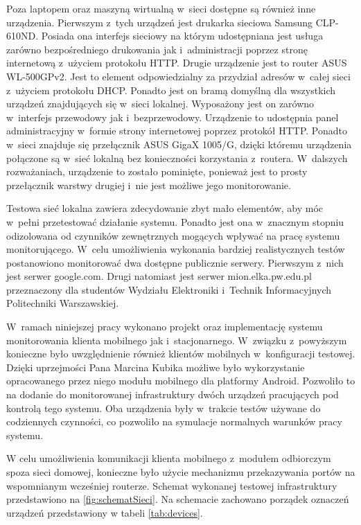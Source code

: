 Poza laptopem oraz maszyną wirtualną w~sieci dostępne są również inne
urządzenia. Pierwszym z~tych urządzeń jest drukarka sieciowa Samsung
CLP-610ND. Posiada ona interfejs sieciowy na którym udostępniana jest
usługa zarówno bezpośredniego drukowania jak i~administracji poprzez
stronę internetową z~użyciem protokołu HTTP. Drugie urządzenie jest to
router ASUS WL-500GPv2. Jest to element odpowiedzialny za przydział
adresów w~całej sieci z~użyciem protokołu DHCP. Ponadto jest on bramą
domyślną dla wszystkich urządzeń znajdujących się w~sieci
lokalnej. Wyposażony jest on zarówno w~interfejs przewodowy jak
i~bezprzewodowy. Urządzenie to udostępnia panel administracyjny
w~formie strony internetowej poprzez protokół HTTP. Ponadto w~sieci
znajduje się przełącznik ASUS GigaX 1005/G, dzięki któremu urządzenia
połączone są w~sieć lokalną bez konieczności korzystania
z~routera. W~dalszych rozważaniach, urządzenie to zostało pominięte,
ponieważ jest to prosty przełącznik warstwy drugiej i~nie jest możliwe
jego monitorowanie.

Testowa sieć lokalna zawiera zdecydowanie zbyt mało elementów, aby móc
w~pełni przetestować działanie systemu. Ponadto jest ona w~znacznym
stopniu odizolowana od czynników zewnętrznych mogących wpływać na
pracę systemu monitorującego. W~celu umożliwienia wykonania bardziej
realistycznych testów postanowiono monitorować dwa dostępne publicznie
serwery. Pierwszym z~nich jest serwer google.com. Drugi natomiast jest
serwer mion.elka.pw.edu.pl przeznaczony dla studentów Wydziału
Elektroniki i~Technik Informacyjnych Politechniki Warszawskiej.

W~ramach niniejszej pracy wykonano projekt oraz implementację systemu
monitorowania klienta mobilnego jak i~stacjonarnego. W~związku
z~powyższym konieczne było uwzględnienie również klientów mobilnych
w~konfiguracji testowej. Dzięki uprzejmości Pana Marcina Kubika
możliwe było wykorzystanie opracowanego przez niego modułu mobilnego
dla platformy Android. Pozwoliło to na dodanie do monitorowanej
infrastruktury dwóch urządzeń pracujących pod kontrolą tego
systemu. Oba urządzenia były w~trakcie testów używane do codziennych
czynności, co pozwoliło na symulacje normalnych warunków pracy
systemu.

W celu umożliwienia komunikacji klienta mobilnego z~modułem odbiorczym
spoza sieci domowej, konieczne było użycie mechanizmu przekazywania
portów na wspomnianym wcześniej routerze. Schemat wykonanej testowej
infrastruktury przedstawiono na \ref{fig:schematSieci}. Na schemacie
zachowano porządek oznaczeń urządzeń przedstawiony w tabeli
\ref{tab:devices}.

